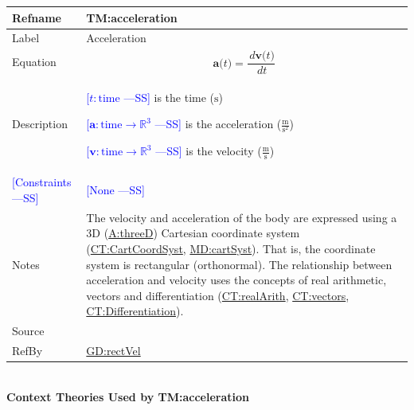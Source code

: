 \documentclass[12pt]{article}
\newcommand{\authornote}[3]{\textcolor{#1}{[#3 ---#2]}}
\newcommand{\authornote}[3]{}
\newcommand{\wss}[1]{\authornote{blue}{SS}{#1}}
\begin{document}
\medskip
\noindent
\begin{minipage}{\textwidth}
\begin{tabular}{>{\raggedright}p{}>{\raggedright\arraybackslash}p{}}
\toprule \textbf{Refname} & \textbf{TM:acceleration}
\label{TM:acceleration}
\\ \midrule
Label & Acceleration
\\ \midrule
Equation & \begin{displaymath}
           \symbf{a}\text{(}t\text{)}=\frac{\,d\symbf{v}\text{(}t\text{)}}{\,dt}
           \end{displaymath}
\\ \midrule
Description & \begin{symbDescription}
              \item{\wss{$t: \text{time}$} is the time (${\text{s}}$)}
              \item{\wss{$\symbf{a}: \text{time} \rightarrow \mathbb{R}^3$} is the acceleration ($\frac{\text{m}}{\text{s}^{2}}$)}
              \item{\wss{$\symbf{v}: \text{time} \rightarrow \mathbb{R}^3$} is the velocity ($\frac{\text{m}}{\text{s}}$)}
              \end{symbDescription}
\\ \midrule
\wss{Constraints} & \wss{None}

\\ \midrule
Notes & The velocity and acceleration of the body are expressed using a 3D
(\hyperref[threeD]{A:threeD}) Cartesian coordinate system
(\hyperref[CT:CartCoordSyst]{CT:CartCoordSyst},
\hyperref[MD:cartSyst]{MD:cartSyst}).  That is, the coordinate system is
rectangular (orthonormal). The relationship between acceleration and velocity
uses the concepts of real arithmetic, vectors and differentiation
(\hyperref[CT:realArith]{CT:realArith}, \hyperref[CT:vectors]{CT:vectors},
\hyperref[CT:Differentiation]{CT:Differentiation}).

\\ \midrule
Source & \cite{accelerationWiki}
         
\\ \midrule
RefBy & \hyperref[GD:rectVel]{GD:rectVel}
        
\\ \bottomrule
\end{tabular}
\end{minipage}
~\\
\noindent \textbf{Context Theories Used by TM:acceleration}
\end{document}

